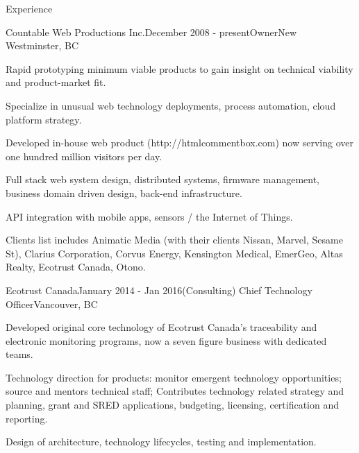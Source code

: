 \documentclass{resume} %
\begin{document}
\begin{rSection}{Experience}



\begin{rSubsection}{Countable Web Productions Inc.}{December 2008 - present}{Owner}{New Westminster, BC}
\item Rapid prototyping minimum viable products to gain insight on technical viability and product-market fit.
\item Specialize in unusual web technology deployments, process automation, cloud platform strategy.
\item Developed in-house web product (http://htmlcommentbox.com) now serving over one hundred million visitors per day.
\item Full stack web system design, distributed systems, firmware management, business domain driven design, back-end infrastructure.
\item API integration with mobile apps, sensors / the Internet of Things.
\item Clients list includes Animatic Media (with their clients Nissan, Marvel, Sesame St), Clarius Corporation, Corvus Energy, Kensington Medical, EmerGeo, Altas Realty, Ecotrust Canada, Otono.
\end{rSubsection}


\begin{rSubsection}{Ecotrust Canada}{January 2014 - Jan 2016}{(Consulting) Chief Technology Officer}{Vancouver, BC}
\item Developed original core technology of Ecotrust Canada's traceability and electronic monitoring programs, now a seven figure business with dedicated teams.
\item Technology direction for products: monitor emergent technology opportunities; source and mentors technical staff; Contributes technology related strategy and planning, grant and SRED applications, budgeting, licensing, certification and reporting.
\item Design of architecture, technology lifecycles, testing and implementation.
\end{rSubsection}


\end{rSection}
\end{document}

